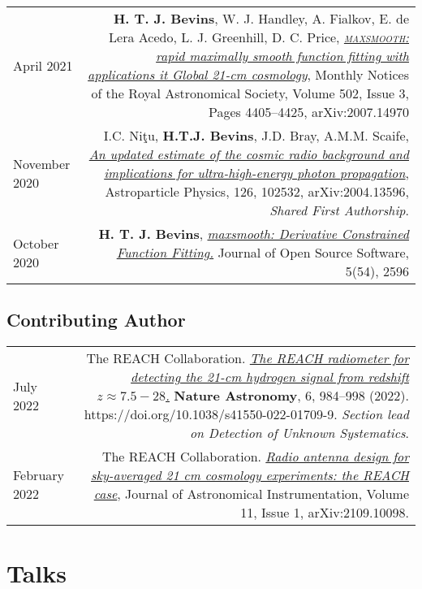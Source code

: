 \documentclass{article}
\begin{document}
\begin{tabular}{L!{\vrule}R}
	April 2021 & \textbf{H. T. J. Bevins}, W. J. Handley, A. Fialkov, E. de Lera Acedo, L. J. Greenhill, D. C. Price, \href{https://academic.oup.com/mnras/article/502/3/4405/6105349?guestAccessKey=769d7461-cc0b-4d83-9cdf-bc351056d911}{\textit{\textsc{maxsmooth}: rapid maximally smooth function fitting with applications it Global 21-cm cosmology}}, Monthly Notices of the Royal Astronomical Society, Volume 502, Issue 3, Pages 4405–4425, 
    arXiv:2007.14970\\
	November 2020 & I.C. Ni\c{t}u, \textbf{H.T.J. Bevins}, J.D. Bray, A.M.M. Scaife, \href{https://www.sciencedirect.com/science/article/pii/S0927650520301043?via\%3Dihub}{\textit{An updated estimate of the cosmic radio background and implications for ultra-high-energy photon propagation}}, Astroparticle Physics, 126, 102532, arXiv:2004.13596, \textit{Shared First Authorship}. \\
	October 2020 & \textbf{H. T. J. Bevins}, \href{https://joss.theoj.org/papers/10.21105/joss.02596}{\textit{maxsmooth: Derivative Constrained Function Fitting.}} Journal of Open Source Software, 5(54), 2596 \\
\end{tabular}

\subsection*{Contributing Author}

\begin{tabular}{L!{\vrule}R}
	July 2022 & The REACH Collaboration. \href{https://www.nature.com/articles/s41550-022-01709-9?utm_campaign=related_content&utm_source=ASTRO&utm_medium=communities}{\textit{The REACH radiometer for detecting the 21-cm hydrogen signal from redshift $z \approx 7.5 -28$.}} \textbf{Nature Astronomy}, 6, 984–998 (2022). https://doi.org/10.1038/s41550-022-01709-9. \textit{Section lead on Detection of Unknown Systematics}. \\
	February 2022 & The REACH Collaboration. \href{https://ui.adsabs.harvard.edu/abs/2021arXiv210910098C/abstract}{\textit{Radio antenna design for sky-averaged 21 cm cosmology experiments: the REACH case}}, Journal of Astronomical Instrumentation, Volume 11, Issue 1, arXiv:2109.10098. \\
\end{tabular}

\section*{Talks}
\end{document}
